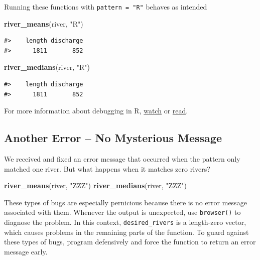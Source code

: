 \documentclass[
]{book}
\newenvironment{Shaded}{\begin{snugshade}}{\end{snugshade}}
\newcommand{\KeywordTok}[1]{\textcolor[rgb]{0.13,0.29,0.53}{\textbf{#1}}}
\newcommand{\NormalTok}[1]{#1}
\newcommand{\StringTok}[1]{\textcolor[rgb]{0.31,0.60,0.02}{#1}}
\begin{document}
Running these functions with \texttt{pattern\ =\ "R"} behaves as intended

\begin{Shaded}
\begin{Highlighting}[]
\KeywordTok{river_means}\NormalTok{(river, }\StringTok{"R"}\NormalTok{)}
\end{Highlighting}
\end{Shaded}

\begin{verbatim}
#>    length discharge 
#>      1811       852
\end{verbatim}

\begin{Shaded}
\begin{Highlighting}[]
\KeywordTok{river_medians}\NormalTok{(river, }\StringTok{"R"}\NormalTok{)}
\end{Highlighting}
\end{Shaded}

\begin{verbatim}
#>    length discharge 
#>      1811       852
\end{verbatim}

For more information about debugging in R, \href{https://www.youtube.com/watch?v=vgYS-F8opgE}{watch} or \href{https://adv-r.hadley.nz/debugging.html}{read}.

\hypertarget{another-error-no-mysterious-message}{%
\subsection{Another Error -- No Mysterious Message}\label{another-error-no-mysterious-message}}

We received and fixed an error message that occurred when the pattern only matched one river. But what happens when it matches zero rivers?

\begin{Shaded}
\begin{Highlighting}[]
\KeywordTok{river_means}\NormalTok{(river, }\StringTok{"ZZZ"}\NormalTok{)}
\KeywordTok{river_medians}\NormalTok{(river, }\StringTok{"ZZZ"}\NormalTok{)}
\end{Highlighting}
\end{Shaded}

These types of bugs are especially pernicious because there is no error message associated with them. Whenever the output is unexpected, use \texttt{browser()} to diagnose the problem. In this context, \texttt{desired\_rivers} is a length-zero vector, which causes problems in the remaining parts of the function. To guard against these types of bugs, program defensively and force the function to return an error message early.
\end{document}
